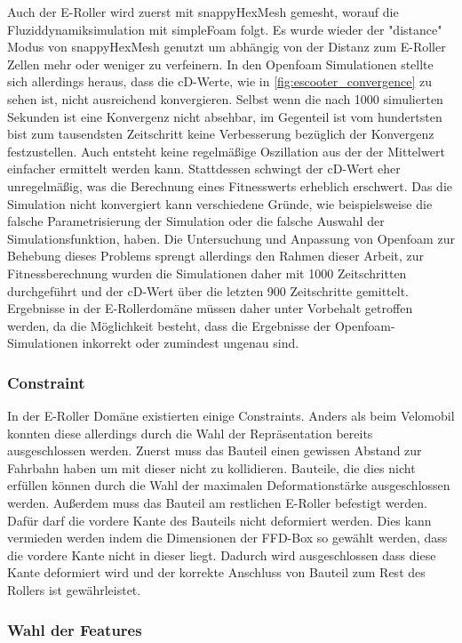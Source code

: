 Auch der E-Roller wird zuerst mit snappyHexMesh gemesht, worauf die Fluziddynamiksimulation mit simpleFoam folgt. 
Es wurde wieder der "distance" Modus von snappyHexMesh genutzt um abhängig von der Distanz zum E-Roller Zellen mehr oder weniger zu verfeinern.
In den Openfoam Simulationen stellte sich allerdings heraus, dass die cD-Werte, wie in \cref{fig:escooter_convergence} zu sehen ist, nicht ausreichend konvergieren.
Selbst wenn die nach 1000 simulierten Sekunden ist eine Konvergenz nicht absehbar, im Gegenteil ist vom hundertsten bist zum tausendsten Zeitschritt keine Verbesserung bezüglich der Konvergenz festzustellen.
Auch entsteht keine regelmäßige Oszillation aus der der Mittelwert einfacher ermittelt werden kann.
Stattdessen schwingt der cD-Wert eher unregelmäßig, was die Berechnung eines Fitnesswerts erheblich erschwert.
Das die Simulation nicht konvergiert kann verschiedene Gründe, wie beispielsweise die falsche Parametrisierung der Simulation oder die falsche Auswahl der Simulationsfunktion, haben.
Die Untersuchung und Anpassung von Openfoam zur Behebung dieses Problems sprengt allerdings den Rahmen dieser Arbeit, zur Fitnessberechnung wurden die Simulationen daher mit 1000 Zeitschritten durchgeführt und der cD-Wert über die letzten 900 Zeitschritte gemittelt.
Ergebnisse in der E-Rollerdomäne müssen daher unter Vorbehalt getroffen werden, da die Möglichkeit besteht, dass die Ergebnisse der Openfoam-Simulationen inkorrekt oder zumindest ungenau sind.

\subsubsection{Constraint}

In der E-Roller Domäne existierten einige Constraints. Anders als beim Velomobil konnten diese allerdings durch die Wahl der Repräsentation bereits ausgeschlossen werden.
Zuerst muss das Bauteil einen gewissen Abstand zur Fahrbahn haben um mit dieser nicht zu kollidieren.
Bauteile, die dies nicht erfüllen können durch die Wahl der maximalen Deformationstärke ausgeschlossen werden.
Außerdem muss das Bauteil am restlichen E-Roller befestigt werden. Dafür darf die vordere Kante des Bauteils nicht deformiert werden.
Dies kann vermieden werden indem die Dimensionen der FFD-Box so gewählt werden, dass die vordere Kante nicht in dieser liegt.
Dadurch wird ausgeschlossen dass diese Kante deformiert wird und der korrekte Anschluss von Bauteil zum Rest des Rollers ist gewährleistet.

\subsubsection{Wahl der Features}

